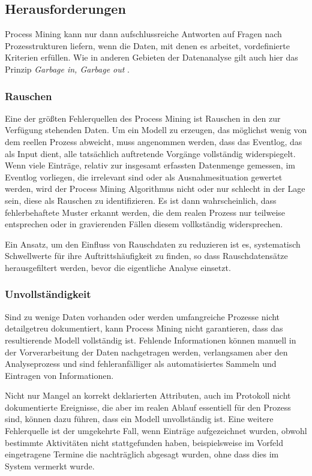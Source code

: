 \subsection{Herausforderungen}\label{challanges}
Process Mining kann nur dann aufschlussreiche Antworten auf Fragen nach Prozesstrukturen liefern, wenn die Daten, mit denen es arbeitet, vordefinierte Kriterien erfüllen. Wie in anderen Gebieten der Datenanalyse gilt auch hier das Prinzip \textit{Garbage in, Garbage out} \cite{GIGO}. 

\subsubsection{Rauschen}
Eine der größten Fehlerquellen des Process Mining ist Rauschen in den zur Verfügung stehenden Daten. Um ein Modell zu erzeugen, das möglichst wenig von dem reellen Prozess abweicht, muss angenommen werden, dass das Eventlog, das als Input dient, alle tatsächlich auftretende Vorgänge vollständig widerspiegelt. Wenn viele Einträge, relativ zur insgesamt erfassten Datenmenge gemessen, im Eventlog vorliegen, die irrelevant sind oder als Ausnahmesituation gewertet werden, wird der Process Mining Algorithmus nicht oder nur schlecht in der Lage sein, diese als Rauschen zu identifizieren. Es ist dann wahrscheinlich, dass fehlerbehaftete Muster erkannt werden, die dem realen Prozess nur teilweise entsprechen oder in gravierenden Fällen diesem vollkständig widersprechen.

Ein Ansatz, um den Einfluss von Rauschdaten zu reduzieren ist es, systematisch Schwellwerte für ihre Auftrittshäufigkeit zu finden, so dass Rauschdatensätze herausgefiltert werden, bevor die eigentliche Analyse einsetzt. 

\subsubsection{Unvollständigkeit}
Sind zu wenige Daten vorhanden oder werden umfangreiche Prozesse nicht detailgetreu dokumentiert, kann Process Mining nicht garantieren, dass das resultierende Modell vollständig ist. 
Fehlende Informationen können manuell in der Vorverarbeitung der Daten nachgetragen werden, verlangsamen aber den Analyseprozess und sind fehleranfälliger als automatisiertes Sammeln und Eintragen von Informationen. 

Nicht nur Mangel an korrekt deklarierten Attributen, auch im Protokoll nicht dokumentierte Ereignisse, die aber im realen Ablauf essentiell für den Prozess sind, können dazu führen, dass ein Modell unvollständig ist. Eine weitere Fehlerquelle ist der umgekehrte Fall, wenn Einträge aufgezeichnet wurden, obwohl bestimmte Aktivitäten nicht stattgefunden haben, beispielsweise im Vorfeld eingetragene Termine die nachträglich abgesagt wurden, ohne dass dies im System vermerkt wurde. 

